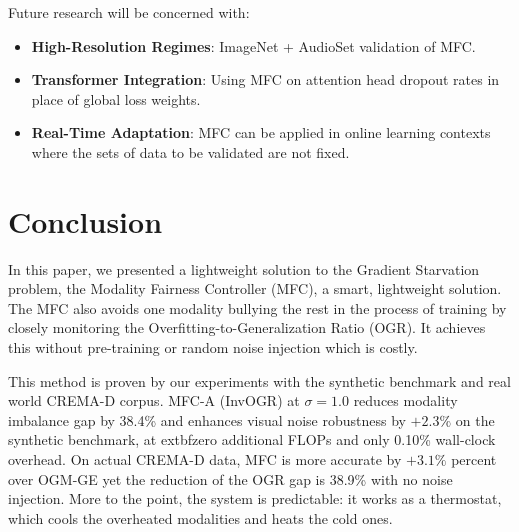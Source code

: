 \documentclass[10pt, twocolumn, letterpaper]{article}
\begin{document}
Future research will be concerned with:
\begin{itemize}
    \item \textbf{High-Resolution Regimes}: ImageNet + AudioSet \cite{gemmeke2017audio} validation of MFC.
    \item \textbf{Transformer Integration}: Using MFC on attention head dropout rates in place of global loss weights.
    \item \textbf{Real-Time Adaptation}: MFC can be applied in online learning contexts where the sets of data to be validated are not fixed.
\end{itemize}

\section{Conclusion}
In this paper, we presented a lightweight solution to the Gradient Starvation problem, the Modality Fairness Controller (MFC), a smart, lightweight solution. The MFC also avoids one modality bullying the rest in the process of training by closely monitoring the Overfitting-to-Generalization Ratio (OGR). It achieves this without pre-training or random noise injection which is costly.

This method is proven by our experiments with the synthetic benchmark and real world CREMA-D corpus. MFC-A (InvOGR) at $\sigma{=}1.0$ reduces modality imbalance gap by 38.4\% and enhances visual noise robustness by $+2.3\%$ on the synthetic benchmark, at 	extbf{zero additional FLOPs} and only 0.10\% wall-clock overhead. On actual CREMA-D data, MFC is more accurate by $+3.1\%$ percent over OGM-GE yet the reduction of the OGR gap is 38.9\% with no noise injection. More to the point, the system is predictable: it works as a thermostat, which cools the overheated modalities and heats the cold ones.



\end{document}
